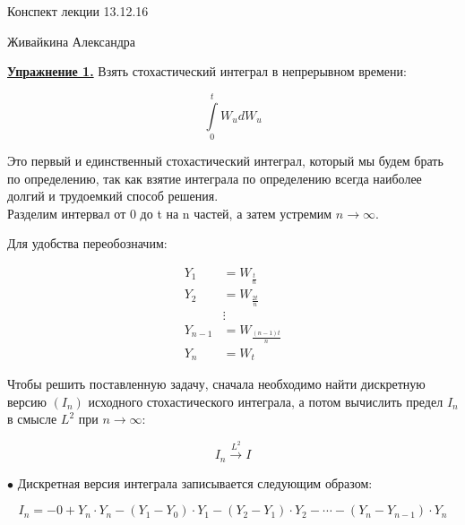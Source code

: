\documentclass[a4paper]{article}
\begin{document}
 \begin{center}
 {\Large{Конспект лекции 13.12.16}}
 \end{center}
  \begin{center}
 {\large{Живайкина Александра}}
 \end{center}
 \par {\bf\underline{Упражнение 1.}} Взять стохастический интеграл в непрерывном времени:

 $$\int\limits_{0}^{t}W_udW_u$$

 Это первый и единственный стохастический интеграл, который мы будем брать по определению, так как взятие интеграла по определению всегда наиболее долгий и трудоемкий способ решения.\\

 Разделим интервал от 0 до t на n частей, а затем устремим $n \rightarrow \infty$.

 \begin{figure}[h]
 \label{image}
 \end{figure}

 Для удобства переобозначим:

 \begin{equation*}
 \begin{aligned}
 Y_1 &= W_{\frac{t}{n}}\\
 Y_2 &= W_{\frac{2t}{n}}\\
 &\vdots\\
 Y_{n-1} &= W_{\frac{(n-1)t}{n}}\\
 Y_n &= W_t
 \end{aligned}
 \end{equation*}

 Чтобы решить поставленную задачу, сначала необходимо найти дискретную версию $(I_n)$ исходного стохастического интеграла, а потом вычислить предел $I_n$ в смысле $L^2$ при $n \rightarrow \infty$:

 $$I_n \xrightarrow{L^2} I$$

 $\bullet$ Дискретная версия интеграла записывается следующим образом:

 $$I_n = -0 + Y_n \cdot Y_n - \left(Y_1-Y_0\right)\cdot Y_1-\left(Y_2-Y_1\right)\cdot Y_2-\cdots-\left(Y_n-Y_{n-1}\right)\cdot Y_n$$
\end{document}
